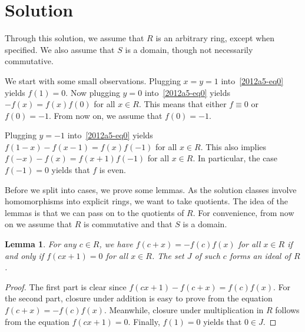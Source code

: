 \documentclass{article}
\newtheorem{lemma}{Lemma}
\begin{document}
\section*{Solution}

Through this solution, we assume that $R$ is an arbitrary ring, except when specified.
We also assume that $S$ is a domain, though not necessarily commutative.

We start with some small observations.
Plugging $x = y = 1$ into~\eqref{2012a5-eq0} yields $f(1) = 0$.
Now plugging $y = 0$ into~\eqref{2012a5-eq0} yields $-f(x) = f(x) f(0)$ for all $x \in R$.
This means that either $f \equiv 0$ or $f(0) = -1$.
From now on, we assume that $f(0) = -1$.

Plugging $y = -1$ into~\eqref{2012a5-eq0} yields $f(1 - x) - f(x - 1) = f(x) f(-1)$ for all $x \in R$.
This also implies $f(-x) - f(x) = f(x + 1) f(-1)$ for all $x \in R$.
In particular, the case $f(-1) = 0$ yields that $f$ is even.

Before we split into cases, we prove some lemmas.
As the solution classes involve homomorphisms into explicit rings, we want to take quotients.
The idea of the lemmas is that we can pass on to the quotients of $R$.
For convenience, from now on we assume that $R$ is commutative and that $S$ is a domain.

\begin{lemma}\label{2012a5-1}
For any $c \in R$, we have $f(c + x) = -f(c) f(x)$ for all $x \in R$ if and only if $f(cx + 1) = 0$ for all $x \in R$.
The set $J$ of such $c$ forms an ideal of $R$.
\end{lemma}
\begin{proof}
The first part is clear since $f(cx + 1) - f(c + x) = f(c) f(x)$.
For the second part, closure under addition is easy to prove from the equation $f(c + x) = -f(c) f(x)$.
Meanwhile, closure under multiplication in $R$ follows from the equation $f(cx + 1) = 0$.
Finally, $f(1) = 0$ yields that $0 \in J$.
\end{proof}
\end{document}
